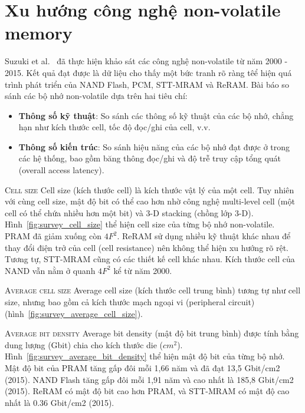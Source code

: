 \section{Xu hướng công nghệ non-volatile memory}
\label{chap:experiments}

Suzuki et al.~\cite{suzukiSurveyTrendsNonVolatile2015a} đã thực hiện khảo sát
các công nghệ non-volatile từ năm 2000 - 2015. Kết quả đạt được là dữ liệu cho
thấy một bức tranh rõ ràng têể hiện quá trình phát triển của NAND Flash, PCM,
STT-MRAM và ReRAM. Bài báo so sánh các bộ nhớ non-volatile dựa trên hai tiêu
chí:

\begin{itemize}
    \item \textbf{Thông số kỹ thuật}: So sánh các thông số kỹ thuật của các bộ
    nhớ, chẳng hạn như kích thước cell, tốc độ đọc/ghi của cell, v.v.

    \item \textbf{Thông số kiến trúc}: So sánh hiệu năng của các bộ nhớ đạt
    được ở trong các hệ thống, bao gồm băng thông đọc/ghi và độ trễ truy cập
    tổng quát (overall access latency).
\end{itemize}

\textsc{Cell size} \hspace{0.5cm} Cell size (kích thước cell) là kích thước vật
lý của một cell. Tuy nhiên với cùng cell size, mật độ bit có thể cao hơn nhờ
công nghệ multi-level cell (một cell có thể chứa nhiều hơn một bit) và 3-D
stacking (chồng lớp 3-D). Hình~\ref{fig:survey_cell_size} thể hiện cell size
của từng bộ nhớ non-volatile. PRAM đã giảm xuống còn $4F^2$. ReRAM sử dụng
nhiều kỹ thuật khác nhau để thay đổi điện trở của cell (cell resistance) nên
không thể hiện xu hướng rõ rệt. Tương tự, STT-MRAM cũng có các thiết kế cell
khác nhau. Kích thước cell của NAND vẫn nằm ở quanh $4F^2$ kể từ năm 2000.


\textsc{Average cell size} \hspace{0.5cm} Average cell size (kích thước cell
trung bình) tương tự như cell size, nhưng bao gồm cả kích thước mạch ngoại vi
(peripheral circuit) (hình~\ref{fig:survey_average_cell_size}).


\textsc{Average bit density} \hspace{0.5cm} Average bit density (mật độ bit
trung bình) được tính bằng dung lượng (Gbit) chia cho kích thước die ($cm^2$).
Hình~\ref{fig:survey_average_bit_density} thể hiện mật độ bit của từng bộ nhớ.
Mật độ bit của PRAM tăng gấp đôi mỗi 1,66 năm và đã đạt 13,5 Gbit/cm2 (2015).
NAND Flash tăng gấp đôi mỗi 1,91 năm và cao nhất là 185,8 Gbit/cm2 (2015).
ReRAM có mật độ bit cao hơn PRAM, và STT-MRAM có mật độ cao nhất là 0.36
Gbit/cm2 (2015).

